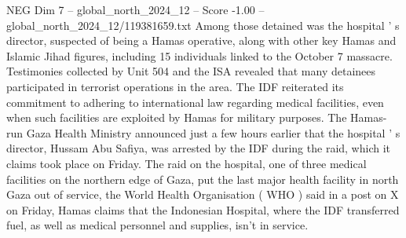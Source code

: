 \begin{textsample}{NEG Dim 7 – global\_north\_2024\_12 – Score -1.00 – global\_north\_2024\_12/119381659.txt}
Among those detained was the hospital ' s director, suspected of being a Hamas operative, along with other key Hamas and Islamic Jihad figures, including 15 individuals linked to the October 7 massacre.
Testimonies collected by Unit 504 and the ISA revealed that many detainees participated in terrorist operations in the area.
The IDF reiterated its commitment to adhering to international law regarding medical facilities, even when such facilities are exploited by Hamas for military purposes.
The Hamas-run Gaza Health Ministry announced just a few hours earlier that the hospital ' s director, Hussam Abu Safiya, was arrested by the IDF during the raid, which it claims took place on Friday.
The raid on the hospital, one of three medical facilities on the northern edge of Gaza, put the last major health facility in north Gaza out of service, the World Health Organisation ( WHO ) said in a post on X on Friday, Hamas claims that the Indonesian Hospital, where the IDF transferred fuel, as well as medical personnel and supplies, isn't in service.

\end{textsample}
